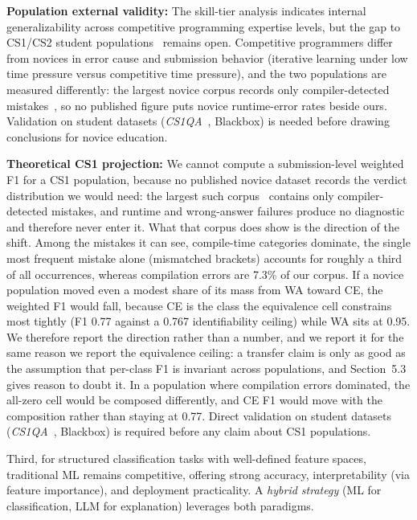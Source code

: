 \documentclass[acmsmall]{acmart}
\begin{document}
\textbf{Population external validity:} The skill-tier analysis indicates
internal generalizability across competitive programming expertise levels, but
the gap to CS1/CS2 student populations~\cite{yadav2021collaborative}
remains open. Competitive programmers differ from novices in error cause and
submission behavior (iterative learning under low time pressure versus
competitive time pressure), and the two populations are measured differently:
the largest novice corpus records only compiler-detected mistakes~\cite{altadmri2015most},
so no published figure puts novice runtime-error rates beside ours.
Validation on student datasets (\emph{CS1QA}~\cite{lee2022cs1qa}, Blackbox)
is needed before drawing conclusions for novice education.



\textbf{Theoretical CS1 projection:}\label{sec:cs1-projection} We cannot compute a
submission-level weighted F1 for a CS1 population, because no published novice
dataset records the verdict distribution we would need: the largest such
corpus~\cite{altadmri2015most} contains only compiler-detected mistakes, and
runtime and wrong-answer failures produce no diagnostic and therefore never
enter it. What that corpus does show is the direction of the shift. Among the
mistakes it can see, compile-time categories dominate, the single most frequent
mistake alone (mismatched brackets) accounts for roughly a third of all
occurrences, whereas compilation errors are 7.3\% of our corpus. If a novice
population moved even a modest share of its mass from WA toward CE, the weighted
F1 would fall, because CE is the class the equivalence cell constrains most
tightly (F1 0.77 against a 0.767 identifiability ceiling) while WA sits at 0.95.
We therefore report the direction rather than a number, and we report it for the
same reason we report the equivalence ceiling: a transfer claim is only as good
as the assumption that per-class F1 is invariant across populations, and
Section~5.3 gives reason to doubt it. In a population where compilation errors
dominated, the all-zero cell would be composed differently, and CE F1 would move
with the composition rather than staying at 0.77. Direct validation on student
datasets (\emph{CS1QA}~\cite{lee2022cs1qa}, Blackbox) is required before any
claim about CS1 populations.



Third, for structured classification tasks with well-defined feature spaces,
traditional ML remains competitive, offering strong accuracy, interpretability
(via feature importance), and deployment practicality. A \textit{hybrid
strategy} (ML for classification, LLM for explanation) leverages both
paradigms.
\end{document}
